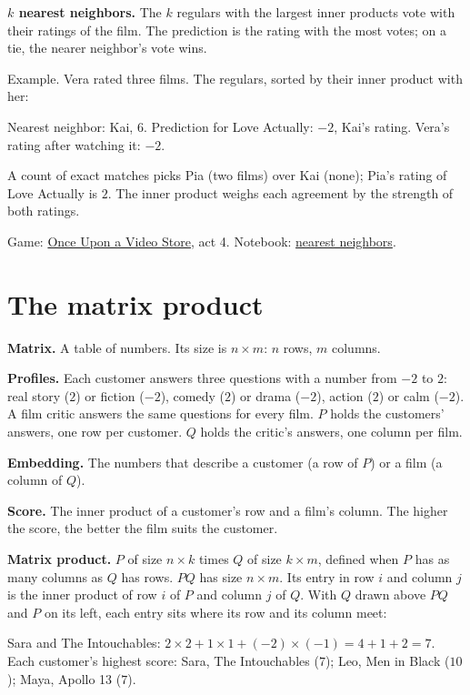 \documentclass[11pt,a4paper]{article}
\newcommand{\term}[1]{\textbf{#1}}
\newcommand{\VideoStore}{\href{https://eth-ainit-hs26.github.io/AINIT-PAGE/viz/we2/video-store/}{Once Upon a Video Store}}
\newcommand{\NotebookNN}{\href{https://colab.research.google.com/github/eth-ainit-hs26/w2-cx-public/blob/main/01_cx_nearest_neighbours_student.ipynb}{nearest neighbors}}
\begin{document}
\term{$k$ nearest neighbors.} The $k$ regulars with the largest inner products vote with their ratings of the film.
The prediction is the rating with the most votes; on a tie, the nearer neighbor's vote wins.

Example. Vera rated three films. The regulars, sorted by their inner product with her:
\begin{center}

\end{center}
Nearest neighbor: Kai, $6$. Prediction for Love Actually: $-2$, Kai's rating. Vera's rating after watching it: $-2$.

A count of exact matches picks Pia (two films) over Kai (none); Pia's rating of Love Actually is $2$. The inner
product weighs each agreement by the strength of both ratings.

Game: \VideoStore, act 4. Notebook: \NotebookNN.

\section{The matrix product}

\term{Matrix.} A table of numbers. Its size is $n \times m$: $n$ rows, $m$ columns.

\term{Profiles.} Each customer answers three questions with a number from $-2$ to $2$: real story ($2$) or fiction
($-2$), comedy ($2$) or drama ($-2$), action ($2$) or calm ($-2$). A film critic answers the same questions for
every film. $P$ holds the customers' answers, one row per customer. $Q$ holds the critic's answers, one column per
film.

\term{Embedding.} The numbers that describe a customer (a row of $P$) or a film (a column of $Q$).

\term{Score.} The inner product of a customer's row and a film's column. The higher the score, the better the film
suits the customer.

\term{Matrix product.} $P$ of size $n \times k$ times $Q$ of size $k \times m$, defined when $P$ has as many columns
as $Q$ has rows. $PQ$ has size $n \times m$. Its entry in row $i$ and column $j$ is the inner product of row $i$ of
$P$ and column $j$ of $Q$. With $Q$ drawn above $PQ$ and $P$ on its left, each entry sits where its row and its
column meet:
\begin{center}

\end{center}
Sara and The Intouchables: $2 \times 2 + 1 \times 1 + (-2) \times (-1) = 4 + 1 + 2 = 7$. Each customer's highest
score: Sara, The Intouchables ($7$); Leo, Men in Black ($10$); Maya, Apollo 13 ($7$).
\end{document}
